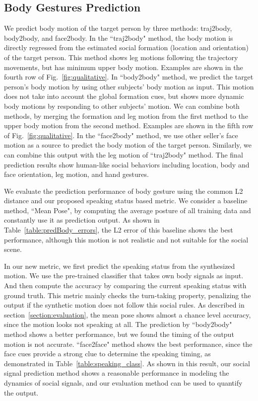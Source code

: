 \subsection{Body Gestures Prediction}

We predict body motion of the target person by three methods: traj2body, body2body, and face2body. In the ``traj2body" method, the body motion is directly regressed from the estimated social formation (location and orientation) of the target person. This method shows leg motions following the trajectory movements, but has minimum upper body motion. Examples are shown in the fourth row of Fig.~\ref{fig:qualitative}. In ``body2body" method, we predict the target person's body motion by using other subjects' body motion as input. This motion does not take into account the global formation cues, but shows more dynamic body motions by responding to other subjects' motion. We can combine both methods, by merging the formation and leg motion from the first method to the upper body motion from the second method. Examples are shown in the fifth row of Fig.~\ref{fig:qualitative}. In the ``face2body" method, we use other seller's face motion as a source to predict the body motion of the target person. Similarly, we can combine this output with the leg motion of ``traj2body" method. The final prediction results show human-like social behaviors including location, body and face orientation, leg motion, and hand gestures. 

We evaluate the prediction performance of body gesture using the common L2 distance and our proposed speaking status based metric. We consider a baseline method, ``Mean Pose", by computing the average posture of all training data and constantly use it as prediction output. As shown in Table~\ref{table:predBody_errors}, the L2 error of this baseline shows the best performance, although this motion is not realistic and not suitable for the social scene.

In our new metric, we first predict the speaking status from the synthesized motion. We use the pre-trained classifier that takes own body signals as input. And then compute the accuracy by comparing the current speaking status with ground truth. This metric mainly checks the turn-taking property, penalizing the output if the synthetic motion does not follow this social rules. As described in section~\ref{section:evaluation}, the mean pose shows almost a chance level accuracy, since the motion looks not speaking at all. The prediction by ``body2body" method shows a better performance, but we found the timing of the output motion is not accurate. ``face2face" method shows the best performance, since the face cues provide a strong clue to determine the speaking timing, as demonstrated in Table~\ref{table:speaking_class}. As shown in this result, our social signal prediction method shows a reasonable performance in modeling the dynamics of social signals, and our evaluation method can be used to quantify the output.


